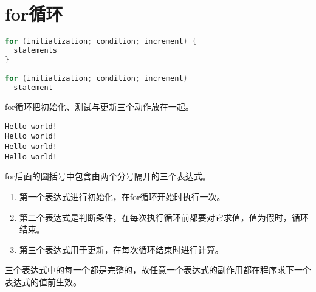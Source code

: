 \section{for循环}
\begin{frame}[fragile]\ft{\secname}
\begin{lstlisting}[language=c,frame=single]
for (initialization; condition; increment) {
  statements
}

for (initialization; condition; increment) 
  statement
\end{lstlisting} 

for循环把初始化、测试与更新三个动作放在一起。

\end{frame}


\begin{frame}[fragile]\ft{\secname}

\end{frame}


\begin{frame}[fragile]\ft{\secname}
\begin{lstlisting}[backgroundcolor=\color{red!10}]
Hello world!
Hello world!
Hello world!
Hello world!
\end{lstlisting} 
\end{frame}


\begin{frame}[fragile]\ft{\secname}
for后面的圆括号中包含由两个分号隔开的三个表达式。\vspace{0.1in}

\begin{enumerate}
\item 第一个表达式进行初始化，在for循环开始时执行一次。\\[0.1in]
\item 第二个表达式是判断条件，在每次执行循环前都要对它求值，值为假时，循环结束。\\[0.1in]
\item 第三个表达式用于更新，在每次循环结束时进行计算。\\[0.1in]
\end{enumerate}
三个表达式中的每一个都是完整的，故任意一个表达式的副作用都在程序求下一个表达式的值前生效。
\end{frame}

\begin{frame}[fragile]\ft{\secname}

\end{frame}

